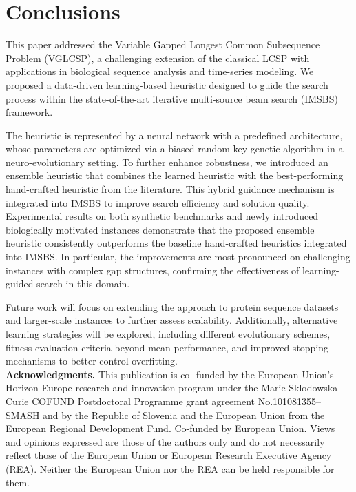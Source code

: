 \documentclass[runningheads]{llncs}
\begin{document}
 
\section{Conclusions}\label{sec:conclusions}

This paper addressed the Variable Gapped Longest Common Subsequence Problem (VGLCSP), a challenging extension of the classical LCSP with applications in biological sequence analysis and time-series modeling. We proposed a data-driven learning-based heuristic designed to guide the search process within the state-of-the-art iterative multi-source beam search (IMSBS) framework.

The heuristic is represented by a neural network with a predefined architecture, whose parameters are optimized via a biased random-key genetic algorithm in a neuro-evolutionary setting. To further enhance robustness, we introduced an ensemble heuristic that combines the learned heuristic with the best-performing hand-crafted heuristic from the literature. This hybrid guidance mechanism is integrated into IMSBS to improve search efficiency and solution quality. Experimental results on both synthetic benchmarks and newly introduced biologically motivated instances demonstrate that the proposed ensemble heuristic consistently outperforms the baseline hand-crafted heuristics integrated into \textsc{IMSBS}. In particular, the improvements are most pronounced on challenging instances with complex gap structures, confirming the effectiveness of learning-guided search in this domain.

Future work will focus on extending the approach to protein sequence datasets and larger-scale instances to further assess scalability. Additionally, alternative learning strategies will be explored, including different evolutionary schemes, fitness evaluation criteria beyond mean performance, and improved stopping mechanisms to better control overfitting.\\
   
   \footnotesize{\textbf{Acknowledgments.}    This publication is co- funded by the European Union’s Horizon Europe research and innovation program under the Marie Sklodowska-Curie COFUND Postdoctoral Programme grant agreement No.101081355-- SMASH and by the Republic of Slovenia and the European Union from the European Regional Development Fund. Co-funded by European Union.  Views and opinions expressed are those of the authors only and do not necessarily reflect those of the European Union or European Research Executive Agency (REA). Neither the European Union nor the REA can be held responsible for them.}
	
\end{document}
